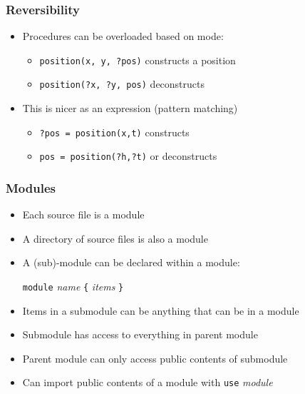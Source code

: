 \documentclass[12pt]{beamer}
\begin{document}
\begin{frame}[fragile]
\frametitle{Reversibility}
\begin{itemize}
\item Procedures can be overloaded based on mode:
  \begin{itemize}
    \item \texttt{position(x, y, ?pos)}  constructs a position
    \item \texttt{position(?x, ?y, pos)}  deconstructs
  \end{itemize}
\item This is nicer as an expression (pattern matching)
  \begin{itemize}
  \item  \texttt{?pos = position(x,t)} constructs
  \item  \texttt{pos = position(?h,?t)} or deconstructs
  \end{itemize}
\end{itemize}
\end{frame}


\begin{frame}[fragile]
\frametitle{Modules}
\begin{itemize}
\item Each source file is a module
\item A directory of source files is also a module
\item A (sub)-module can be declared within a module: \\
  \begin{center}
    \texttt{module} \emph{name} \texttt{\{} \emph{items} \texttt{\}}
  \end{center}
\item Items in a submodule can be anything that can be in a module
\item Submodule has access to everything in parent module
\item Parent module can only access public contents of submodule
\item Can import public contents of a module with \texttt{use} \emph{module}
\end{itemize}
\end{frame}
\end{document}
